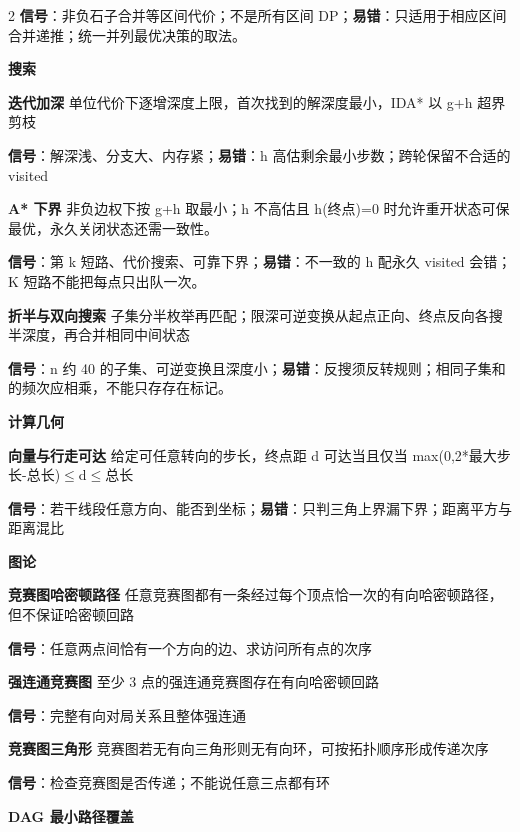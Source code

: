 \documentclass[UTF8,fontset=fandol,a4paper,twoside]{ctexart}
\newcommand{\topic}[1]{\par\smallskip\textbf{#1}\par\nobreak}
\begin{document}
\begin{multicols}{2}
\textbf{信号}：非负石子合并等区间代价；不是所有区间 DP；\textbf{易错}：只适用于相应区间合并递推；统一并列最优决策的取法。\par
\topic{搜索}
\par\textbf{迭代加深}\quad
单位代价下逐增深度上限，首次找到的解深度最小，IDA* 以 g+\allowbreak{}h 超界剪枝\par
\textbf{信号}：解深浅、分支大、内存紧；\textbf{易错}：h 高估剩余最小步数；跨轮保留不合适的 visited\par
\par\textbf{A* 下界}\quad
非负边权下按 g+\allowbreak{}h 取最小；h 不高估且 h(\allowbreak{}终点)\allowbreak{}=\allowbreak{}0 时允许重开状态可保最优，永久关闭状态还需一致性。\par
\textbf{信号}：第 k 短路、代价搜索、可靠下界；\textbf{易错}：不一致的 h 配永久 visited 会错；K 短路不能把每点只出队一次。\par
\par\textbf{折半与双向搜索}\quad
子集分半枚举再匹配；限深可逆变换从起点正向、终点反向各搜半深度，再合并相同中间状态\par
\textbf{信号}：n 约 40 的子集、可逆变换且深度小；\textbf{易错}：反搜须反转规则；相同子集和的频次应相乘，不能只存存在标记。\par
\topic{计算几何}
\par\textbf{向量与行走可达}\quad
给定可任意转向的步长，终点距 d 可达当且仅当 max(\allowbreak{}0,\allowbreak{}2*最大步长-\allowbreak{}总长)\allowbreak{}\ensuremath{\le}d\ensuremath{\le}总长\par
\textbf{信号}：若干线段任意方向、能否到坐标；\textbf{易错}：只判三角上界漏下界；距离平方与距离混比\par
\topic{图论}
\par\textbf{竞赛图哈密顿路径}\quad
任意竞赛图都有一条经过每个顶点恰一次的有向哈密顿路径，但不保证哈密顿回路\par
\textbf{信号}：任意两点间恰有一个方向的边、求访问所有点的次序\par
\par\textbf{强连通竞赛图}\quad
至少 3 点的强连通竞赛图存在有向哈密顿回路\par
\textbf{信号}：完整有向对局关系且整体强连通\par
\par\textbf{竞赛图三角形}\quad
竞赛图若无有向三角形则无有向环，可按拓扑顺序形成传递次序\par
\textbf{信号}：检查竞赛图是否传递；不能说任意三点都有环\par
\par\textbf{DAG 最小路径覆盖}\quad

\end{multicols}
\end{document}
